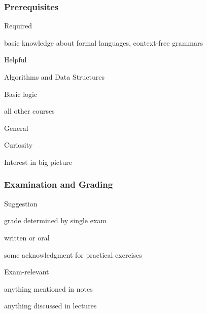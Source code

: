 \documentclass{beamer}
\begin{document}
\begin{frame}\frametitle{Prerequisites}
\begin{blockitems}{Required}
\item basic knowledge about formal languages, context-free grammars
\end{blockitems}

\begin{blockitems}{Helpful}
\item Algorithms and Data Structures
\item Basic logic
\item all other courses
\end{blockitems}

\begin{blockitems}{General}
\item Curiosity 
\item Interest in big picture 
\end{blockitems}
\end{frame}

\begin{frame}\frametitle{Examination and Grading}
\begin{blockitems}{Suggestion}
\item grade determined by single exam
\item written or oral 
\item some acknowledgment for practical exercises
\end{blockitems}

\begin{blockitems}{Exam-relevant}
\item anything mentioned in notes
\item anything discussed in lectures
\end{blockitems}
\end{frame}
\end{document}
